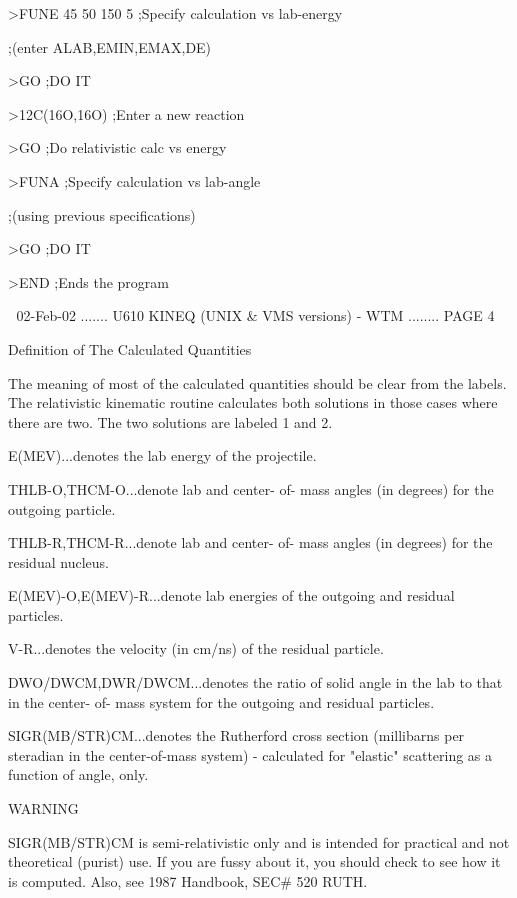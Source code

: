    >FUNE 45 50 150 5               ;Specify calculation vs lab-energy
 
                                   ;(enter ALAB,EMIN,EMAX,DE)
 
   >GO                             ;DO IT
 
   >12C(16O,16O)                   ;Enter a new reaction
 
   >GO                             ;Do relativistic calc vs energy
 
   >FUNA                           ;Specify calculation vs lab-angle
 
                                   ;(using previous specifications)
 
   >GO                             ;DO IT
 
   >END                            ;Ends the program
 
    
   02-Feb-02 ....... U610  KINEQ (UNIX & VMS versions) - WTM ........ PAGE   4
 
 
 
                     Definition of The Calculated Quantities
 
   The  meaning  of most of the calculated quantities should be clear from the
   labels. The relativistic kinematic routine  calculates  both  solutions  in
   those cases where there are two. The two solutions are labeled 1 and 2.
 
   E(MEV)...denotes the lab energy of the projectile.
 
   THLB-O,THCM-O...denote  lab  and  center-  of- mass angles (in degrees) for
          the outgoing particle.
 
   THLB-R,THCM-R...denote lab and center- of- mass  angles  (in  degrees)  for
          the residual nucleus.
 
   E(MEV)-O,E(MEV)-R...denote  lab  energies  of  the  outgoing  and  residual
          particles.
 
   V-R...denotes the velocity (in cm/ns) of the residual particle.
 
   DWO/DWCM,DWR/DWCM...denotes the ratio of solid angle in the lab to that  in
          the center- of- mass system for the outgoing and residual particles.
 
 
   SIGR(MB/STR)CM...denotes  the  Rutherford  cross  section  (millibarns  per
          steradian in the center-of-mass system) - calculated  for  "elastic"
          scattering as a function of angle, only.
 
                                     WARNING
 
   SIGR(MB/STR)CM  is semi-relativistic only and is intended for practical and
   not theoretical (purist) use. If you are fussy about it, you  should  check
   to see how it is computed. Also, see 1987 Handbook, SEC# 520 RUTH.
